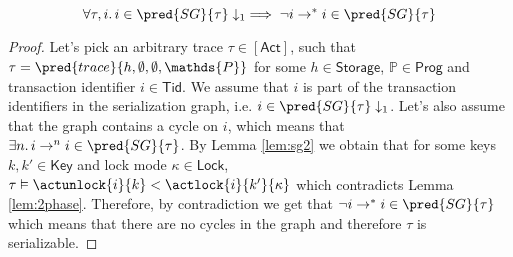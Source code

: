 \thm
\[
\forall \tau, i \ldotp i \in \pred{SG}{\tau} \downarrow_1 \implies \lnot i \rightarrow^* i \in \pred{SG}{\tau}
\]

\begin{proof}
Let's pick an arbitrary trace $\tau \in \mathsf{[Act]}$, such that $\tau = \pred{trace}{h, \emptyset, \emptyset, \mathds{P}}$ for some $h \in \mathsf{Storage}$, $\mathds{P} \in \mathsf{Prog}$ and transaction identifier $i \in \mathsf{Tid}$. We assume that $i$ is part of the transaction identifiers in the serialization graph, i.e. $i \in \pred{SG}{\tau} \downarrow_1$. Let's also assume that the graph contains a cycle on $i$, which means that $\exists n \ldotp i \rightarrow^n i \in \pred{SG}{\tau}$. By Lemma \ref{lem:sg2} we obtain that for some keys $k, k' \in \mathsf{Key}$ and lock mode $\kappa \in \mathsf{Lock}$, $\tau \vDash \actunlock{i}{k} < \actlock{i}{k'}{\kappa}$ which contradicts Lemma \ref{lem:2phase}. Therefore, by contradiction we get that $\lnot i \rightarrow^* i \in \pred{SG}{\tau}$ which means that there are no cycles in the graph and therefore $\tau$ is serializable.
\end{proof}